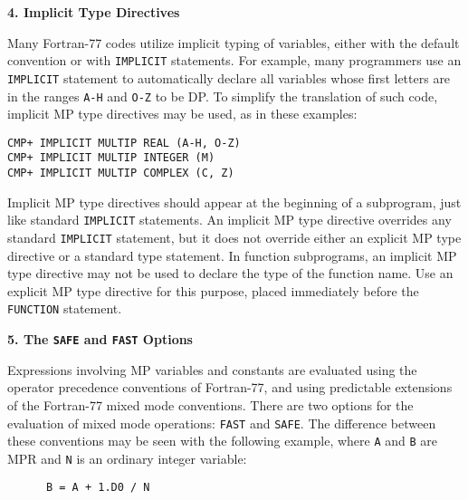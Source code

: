 \vspace{2ex} \noindent
{\bf 4. Implicit Type Directives}

Many Fortran-77 codes utilize implicit typing of variables, either
with the default convention or with {\tt IMPLICIT} statements.  For
example, many programmers use an {\tt IMPLICIT} statement to
automatically declare all variables whose first letters are in the
ranges {\tt A-H} and {\tt O-Z} to be DP.  To simplify the translation
of such code, implicit MP type directives may be used, as in these
examples:

\begin{tt} \begin{small} \begin{verbatim}
CMP+ IMPLICIT MULTIP REAL (A-H, O-Z)
CMP+ IMPLICIT MULTIP INTEGER (M)
CMP+ IMPLICIT MULTIP COMPLEX (C, Z)
\end{verbatim} \end{small} \end{tt}

Implicit MP type directives should appear at the beginning of a
subprogram, just like standard {\tt IMPLICIT} statements.  An implicit
MP type directive overrides any standard {\tt IMPLICIT} statement, but
it does not override either an explicit MP type directive or a
standard type statement.  In function subprograms, an implicit MP type
directive may not be used to declare the type of the function name.
Use an explicit MP type directive for this purpose, placed immediately
before the {\tt FUNCTION} statement.

\vspace{2ex} \noindent
{\bf 5. The {\tt SAFE} and {\tt FAST} Options}

Expressions involving MP variables and constants are evaluated using
the operator precedence conventions of Fortran-77, and using
predictable extensions of the Fortran-77 mixed mode conventions.
There are two options for the evaluation of mixed mode operations:
{\tt FAST} and {\tt SAFE}.  The difference between these conventions
may be seen with the following example, where {\tt A} and {\tt B} are
MPR and {\tt N} is an ordinary integer variable:

\begin{tt} \begin{small} \begin{verbatim}
      B = A + 1.D0 / N
\end{verbatim} \end{small} \end{tt}

